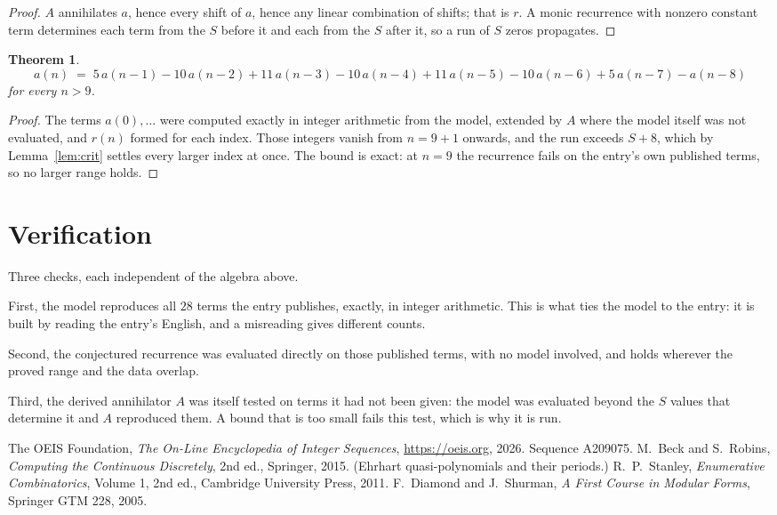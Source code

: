 \documentclass[11pt,a4paper]{article}
\theoremstyle{plain}
\newtheorem{theorem}{Theorem}
\theoremstyle{definition}
\begin{document}
\begin{proof}
$A$ annihilates $a$, hence every shift of $a$, hence any linear combination of shifts; that is
$r$. A monic recurrence with nonzero constant term determines each term from the $S$ before it
and each from the $S$ after it, so a run of $S$ zeros propagates.
\end{proof}

\begin{theorem}
\[
a(n)\;=\;5\,a(n-1) - 10\,a(n-2) + 11\,a(n-3) - 10\,a(n-4) + 11\,a(n-5) - 10\,a(n-6) + 5\,a(n-7) - a(n-8)
\]
for every $n>9$.
\end{theorem}

\begin{proof}
The terms $a(0),\dots$ were computed exactly in integer arithmetic from the model, extended by
$A$ where the model itself was not evaluated, and $r(n)$ formed for each index. Those integers
vanish from $n=9+1$ onwards, and the run exceeds $S+8$, which by
Lemma~\ref{lem:crit} settles every larger index at once. The bound is exact: at $n=9$ the recurrence fails on the entry's own published terms, so no larger range holds.
\end{proof}

\section{Verification}

Three checks, each independent of the algebra above.

First, the model reproduces all $28$ terms the entry publishes, exactly, in integer
arithmetic. This is what ties the model to the entry: it is built by reading the entry's
English, and a misreading gives different counts.

Second, the conjectured recurrence was evaluated directly on those published terms, with no
model involved, and holds wherever the proved range and the data overlap.

Third, the derived annihilator $A$ was itself tested on terms it had not been given: the model
was evaluated beyond the $S$ values that determine it and $A$ reproduced them. A bound that is
too small fails this test, which is why it is run.

\begin{thebibliography}{9}
 The OEIS Foundation, \emph{The On-Line Encyclopedia of Integer
Sequences}, \url{https://oeis.org}, 2026. Sequence A209075.
 M.~Beck and S.~Robins, \emph{Computing the Continuous Discretely},
2nd ed., Springer, 2015. (Ehrhart quasi-polynomials and their periods.)
 R.~P.~Stanley, \emph{Enumerative Combinatorics}, Volume 1, 2nd ed.,
Cambridge University Press, 2011.
 F.~Diamond and J.~Shurman, \emph{A First Course in Modular Forms},
Springer GTM 228, 2005.
\end{thebibliography}
\end{document}
